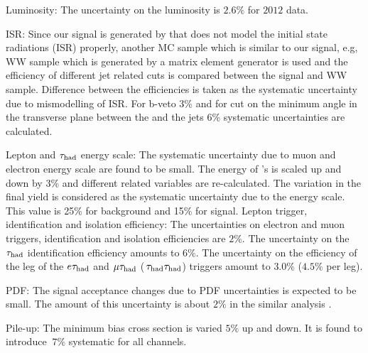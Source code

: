  Luminosity: The uncertainty on the luminosity  is $2.6\%$ for $2012$ data.

 ISR: Since our signal is generated by \PYTHIA that does not  model the initial state radiations (ISR) properly, another MC sample which is similar to our signal, e.g, WW sample 
which is generated by a matrix element generator is used and the efficiency of different jet related cuts is compared between the signal and WW sample. Difference between the
efficiencies is taken as the systematic uncertainty due to mismodelling of ISR. For b-veto 3\% and for cut on   the minimum angle in the transverse plane between 
the \MET and the jets 6\% systematic uncertainties are  calculated.  

 Lepton and $\tau_{\rm had}$ energy scale: The systematic uncertainty due to muon and electron energy scale are found to be small.
The energy of \hadtau's is scaled up and down by $3\%$ and different \Tau related variables are re-calculated.  The variation in the final yield is considered as the
systematic uncertainty due to the \Tau energy scale. This value is 25\% for background and 15\% for signal.
 Lepton trigger, identification and isolation efficiency: The uncertainties on electron and muon triggers, identification and isolation efficiencies are $2\%$. 
The uncertainty on the $\tau_{\rm had}$ identification efficiency amounts to $6\%$. 
The uncertainty on the efficiency of the \Tau leg of the $e\tau_{\rm had}$ and $\mu\tau_{\rm had}$ ($\,\tau_{\rm had}\tau_{\rm had}$) triggers amount to $3.0\%$ ($4.5\%$ per leg).

 PDF: The signal acceptance changes due to PDF uncertainties is expected to be small. 
The amount of this uncertainty is about $2\%$ in the similar analysis \cite{Khachatryan:2014qwa}.

 Pile-up: The minimum bias cross section is varied $5 \%$ up and down. It is found to introduce $~7 \%$ systematic for all channels.    



